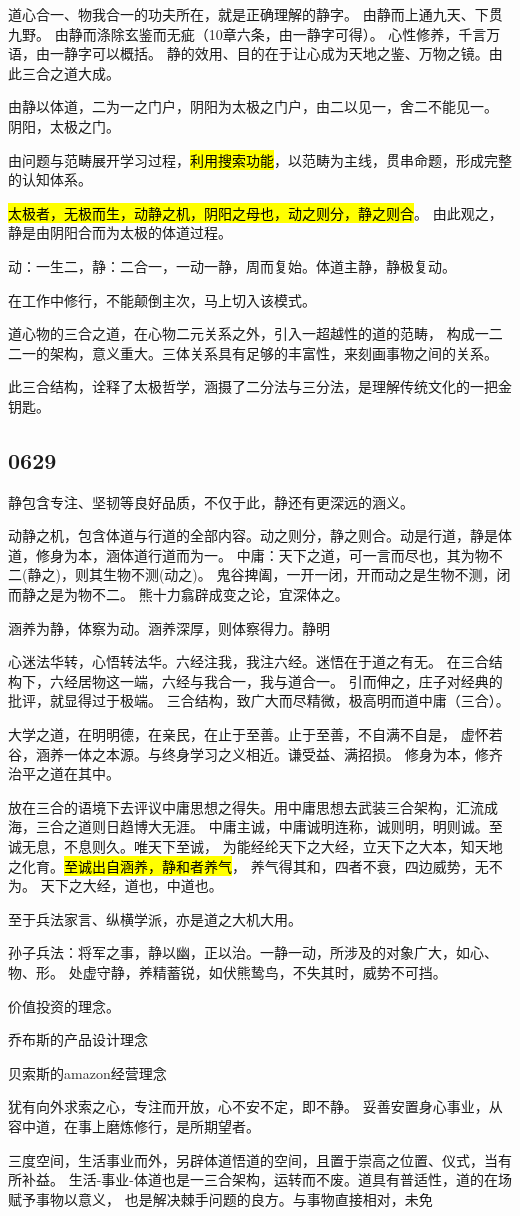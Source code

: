 道心合一、物我合一的功夫所在，就是正确理解的静字。
由静而上通九天、下贯九野。
由静而涤除玄鉴而无疵（10章六条，由一静字可得）。
心性修养，千言万语，由一静字可以概括。
静的效用、目的在于让心成为天地之鉴、万物之镜。由此三合之道大成。

由静以体道，二为一之门户，阴阳为太极之门户，由二以见一，舍二不能见一。
阴阳，太极之门。


由问题与范畴展开学习过程，\hl{利用搜索功能}，以范畴为主线，贯串命题，形成完整的认知体系。

\hl{太极者，无极而生，动静之机，阴阳之母也，动之则分，静之则合}。
由此观之，静是由阴阳合而为太极的体道过程。

动：一生二，静：二合一，一动一静，周而复始。体道主静，静极复动。

在工作中修行，不能颠倒主次，马上切入该模式。

道心物的三合之道，在心物二元关系之外，引入一超越性的道的范畴，
构成一二二一的架构，意义重大。三体关系具有足够的丰富性，来刻画事物之间的关系。

此三合结构，诠释了太极哲学，涵摄了二分法与三分法，是理解传统文化的一把金钥匙。

\subsection{0629}

静包含专注、坚韧等良好品质，不仅于此，静还有更深远的涵义。

动静之机，包含体道与行道的全部内容。动之则分，静之则合。动是行道，静是体道，修身为本，涵体道行道而为一。
中庸：天下之道，可一言而尽也，其为物不二(静之)，则其生物不测(动之)。
鬼谷捭阖，一开一闭，开而动之是生物不测，闭而静之是为物不二。
熊十力翕辟成变之论，宜深体之。

涵养为静，体察为动。涵养深厚，则体察得力。静明

心迷法华转，心悟转法华。六经注我，我注六经。迷悟在于道之有无。
在三合结构下，六经居物这一端，六经与我合一，我与道合一。
引而伸之，庄子对经典的批评，就显得过于极端。
三合结构，致广大而尽精微，极高明而道中庸（三合）。

大学之道，在明明德，在亲民，在止于至善。止于至善，不自满不自是，
虚怀若谷，涵养一体之本源。与终身学习之义相近。谦受益、满招损。
修身为本，修齐治平之道在其中。

放在三合的语境下去评议中庸思想之得失。用中庸思想去武装三合架构，汇流成海，三合之道则日趋博大无涯。
中庸主诚，中庸诚明连称，诚则明，明则诚。至诚无息，不息则久。唯天下至诚，
为能经纶天下之大经，立天下之大本，知天地之化育。\hl{至诚出自涵养，静和者养气}，
养气得其和，四者不衰，四边威势，无不为。
天下之大经，道也，中道也。

至于兵法家言、纵横学派，亦是道之大机大用。

孙子兵法：将军之事，静以幽，正以治。一静一动，所涉及的对象广大，如心、物、形。
处虚守静，养精蓄锐，如伏熊鸷鸟，不失其时，威势不可挡。

价值投资的理念。

乔布斯的产品设计理念

贝索斯的amazon经营理念

犹有向外求索之心，专注而开放，心不安不定，即不静。
妥善安置身心事业，从容中道，在事上磨炼修行，是所期望者。

三度空间，生活事业而外，另辟体道悟道的空间，且置于崇高之位置、仪式，当有所补益。
生活-事业-体道也是一三合架构，运转而不废。道具有普适性，道的在场赋予事物以意义，
也是解决棘手问题的良方。与事物直接相对，未免
